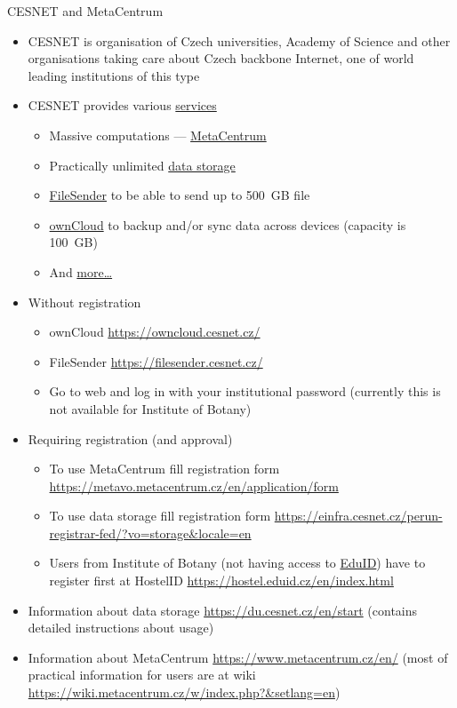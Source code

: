 \documentclass[compress, ucs, xelatex, 11pt, xcolor=svgnames,
  hyperref={
    bookmarks=true,
    unicode=true,
    colorlinks=true,
    pdftitle={Linux, command line and MetaCentrum},
    plainpages=false,
    pdfauthor={Vojtech Zeisek},
    pdfsubject={Course about use of Linux command line, writing shell scripts and using MetaCentrum of CESNET},
    pdfcreator={XeLaTeX, http://www.xelatex.org/},
    pdfkeywords={Linux, GNU, BASH, shell, command line, MetaCentrum},
    linkcolor=Sienna,
    anchorcolor=black,
    citecolor=green,
    filecolor=magenta,
    menucolor=Sienna,
    urlcolor=cyan,
    pdftex},
  url={hyphens, lowtilde} %
  ]{beamer}
\begin{document}
\begin{frame}[allowframebreaks]{CESNET and MetaCentrum}
\begin{itemize}
  \item CESNET is organisation of Czech universities, Academy of Science and other organisations taking care about Czech backbone Internet, one of world leading institutions of this type
  \item CESNET provides various \href{https://www.cesnet.cz/services/?lang=en}{services}
  \begin{itemize}
    \item Massive computations --- \href{https://www.cesnet.cz/services/massive-computations-metacentrum/?lang=en}{MetaCentrum}
    \item Practically unlimited \href{https://www.cesnet.cz/services/data-storage/?lang=en}{data storage}
    \item \href{https://www.cesnet.cz/services/filesender/?lang=en}{FileSender} to be able to send up to 500~GB file
    \item \href{https://www.cesnet.cz/services/owncloud/?lang=en}{ownCloud} to backup and/or sync data across devices (capacity is 100~GB)
    \item And \href{https://www.cesnet.cz/services/?lang=en}{more\ldots}
  \end{itemize}
  \item Without registration
  \begin{itemize}
    \item ownCloud \url{https://owncloud.cesnet.cz/}
    \item FileSender \url{https://filesender.cesnet.cz/}
    \item Go to web and log in with your institutional password (currently this is not available for Institute of Botany)
  \end{itemize}
  \item Requiring registration (and approval)
  \begin{itemize}
    \item To use MetaCentrum fill registration form \url{https://metavo.metacentrum.cz/en/application/form}
    \item To use data storage fill registration form \url{https://einfra.cesnet.cz/perun-registrar-fed/?vo=storage&locale=en}
    \item Users from Institute of Botany (not having access to \href{https://www.eduid.cz/en/index}{EduID}) have to register first at HostelID \url{https://hostel.eduid.cz/en/index.html}
  \end{itemize}
  \item Information about data storage \url{https://du.cesnet.cz/en/start} (contains detailed instructions about usage)
  \item Information about MetaCentrum \url{https://www.metacentrum.cz/en/} (most of practical information for users are at wiki \url{https://wiki.metacentrum.cz/w/index.php?&setlang=en})
\end{itemize}
\end{frame}
\end{document}
